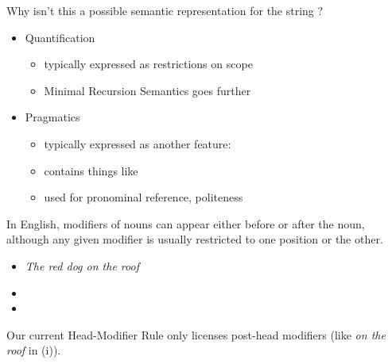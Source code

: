 \documentclass[a4paper,landscape,headrule,footrule]{foils}
\begin{document}
Why isn’t this a possible semantic representation for
the string ?

\noindent{}


\begin{itemize}
\item Quantification
  \begin{itemize}
  \item typically expressed as restrictions on scope
  \item Minimal Recursion Semantics goes further
  \end{itemize}
\item Pragmatics
  \begin{itemize}
  \item typically expressed as another feature: 
  \item contains things like 
  \item used for pronominal reference, politeness
\end{itemize}
\end{itemize}


In English, modifiers of nouns can appear either
before or after the noun, although any given modifier is usually
restricted to one position or the other.

\begin{itemize}
\item[(i)] \textit{The red dog on the roof}
\item[(ii)]  
\item[(iii)]  
\end{itemize}
%
Our current Head-Modifier Rule only licenses post-head modifiers
(like {\it on the roof} in (i)).
\end{document}
